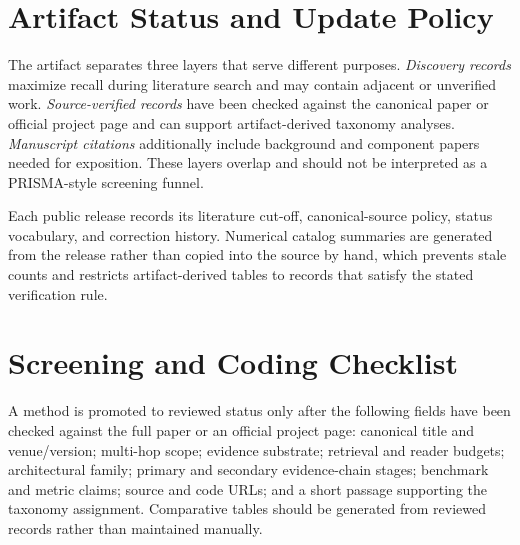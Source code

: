 \documentclass[manuscript,review]{acmart}
\theoremstyle{definition}
\theoremstyle{plain}
\theoremstyle{remark}
\begin{document}
\section{Artifact Status and Update Policy}
\label{app:coverage_counts}

The artifact separates three layers that serve different purposes.
\emph{Discovery records} maximize recall during literature search and may
contain adjacent or unverified work. \emph{Source-verified records} have been
checked against the canonical paper or official project page and can support
artifact-derived taxonomy analyses. \emph{Manuscript citations} additionally
include background and component papers needed for exposition. These layers
overlap and should not be interpreted as a PRISMA-style screening funnel.

Each public release records its literature cut-off, canonical-source
policy, status vocabulary, and correction history. Numerical catalog summaries
are generated from the release rather than copied into the source by hand,
which prevents stale counts and restricts artifact-derived tables to records
that satisfy the stated verification rule.

\section{Screening and Coding Checklist}
\label{app:protocol}

A method is promoted to reviewed status only after the following fields have
been checked against the full paper or an official project page: canonical
title and venue/version; multi-hop scope; evidence substrate; retrieval and
reader budgets; architectural family; primary and secondary evidence-chain
stages; benchmark and metric claims; source and code URLs; and a short passage
supporting the taxonomy assignment. Comparative tables should be generated
from reviewed records rather than maintained manually.


\end{document}
